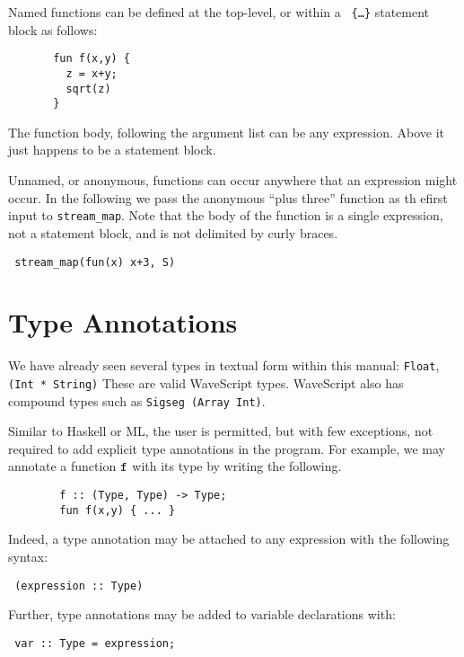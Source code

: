 \documentclass[twocolumn]{report}
\newenvironment{wscode}{\begin{center}\tt}{\end{center}}
\begin{document}
Named functions can be defined at the top-level, or within a {\tt
  \{\ldots\}} statement block as follows:

\begin{verbatim}
       fun f(x,y) {
         z = x+y;
         sqrt(z)
       }
\end{verbatim}

The function body, following the argument list can be any expression.
Above it just happens to be a statement block.  

Unnamed, or anonymous, functions can occur anywhere that an expression
might occur. In the following we pass the anonymous ``plus three''
function as th efirst input to {\tt stream\_map}.  Note that the body
of the function is a single expression, not a statement block, and is
not delimited by curly braces.

\begin{wscode}
stream\_map(fun(x) x+3, S)
\end{wscode}




\section{Type Annotations}

We have already seen several types in textual form within this manual:
{\tt Float}, {\tt (Int * String)} These are valid WaveScript types.
WaveScript also has compound types such as {\tt Sigseg (Array Int)}.

Similar to Haskell or ML, the user is permitted, but with few
exceptions, not required to add explicit type annotations in the
program.  For example, we may annotate a function {$\tt f$}
with its type by writing the following.
%
\begin{verbatim}
        f :: (Type, Type) -> Type;
        fun f(x,y) { ... }
\end{verbatim}

Indeed, a type annotation may be attached to any expression with
the following syntax:
\begin{wscode}
(expression :: Type)
\end{wscode}

Further, type annotations may be added to variable declarations with:
\begin{verbatim}
 var :: Type = expression;
\end{verbatim}
\end{document}

